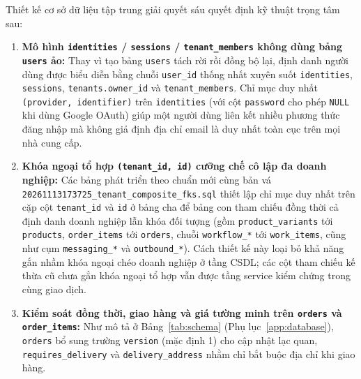 Thiết kế cơ sở dữ liệu tập trung giải quyết sáu quyết định kỹ thuật trọng tâm sau:
\begin{enumerate}
  \item \textbf{Mô hình \texttt{identities} / \texttt{sessions} / \texttt{tenant\_\hspace{0pt}members} không dùng bảng \texttt{users} ảo:} Thay vì tạo bảng \texttt{users} tách rời rồi đồng bộ lại, định danh người dùng được biểu diễn bằng chuỗi \texttt{user\_\hspace{0pt}id} thống nhất xuyên suốt \texttt{identities}, \texttt{sessions}, \texttt{tenants.\hspace{0pt}owner\_\hspace{0pt}id} và \texttt{tenant\_\hspace{0pt}members}.
    Chỉ mục duy nhất \texttt{(provider, identifier)} trên \texttt{identities} (với cột \texttt{password} cho phép \texttt{NULL} khi dùng Google OAuth) giúp một người dùng liên kết nhiều phương thức đăng nhập mà không giả định địa chỉ email là duy nhất toàn cục trên mọi nhà cung cấp.
  \item \textbf{Khóa ngoại tổ hợp \texttt{(tenant\_\hspace{0pt}id, id)} cưỡng chế cô lập đa doanh nghiệp:} Các bảng phát triển theo chuẩn mới cùng bản vá \texttt{20261113173725\_\hspace{0pt}tenant\_\hspace{0pt}composite\_\hspace{0pt}fks.\hspace{0pt}sql} thiết lập chỉ mục duy nhất trên cặp cột \texttt{tenant\_\hspace{0pt}id} và \texttt{id} ở bảng cha để bảng con tham chiếu đồng thời cả định danh doanh nghiệp lẫn khóa đối tượng (gồm \texttt{product\_\hspace{0pt}variants} tới \texttt{products}, \texttt{order\_\hspace{0pt}items} tới \texttt{orders}, chuỗi \texttt{workflow\_\hspace{0pt}*} tới \texttt{work\_\hspace{0pt}items}, cũng như cụm \texttt{messaging\_\hspace{0pt}*} và \texttt{outbound\_\hspace{0pt}*}).
    Cách thiết kế này loại bỏ khả năng gắn nhầm khóa ngoại chéo doanh nghiệp ở tầng CSDL; các cột tham chiếu kế thừa cũ chưa gắn khóa ngoại tổ hợp vẫn được tầng service kiểm chứng trong cùng giao dịch.
  \item \textbf{Kiểm soát đồng thời, giao hàng và giá tường minh trên \texttt{orders} và \texttt{order\_\hspace{0pt}items}:} Như mô tả ở Bảng~\ref{tab:schema} (Phụ lục~\ref{app:database}), \texttt{orders} bổ sung trường \texttt{version} (mặc định 1) cho cập nhật lạc quan, \texttt{requires\_\hspace{0pt}delivery} và \texttt{delivery\_\hspace{0pt}address} nhằm chỉ bắt buộc địa chỉ khi giao hàng.

\end{enumerate}

